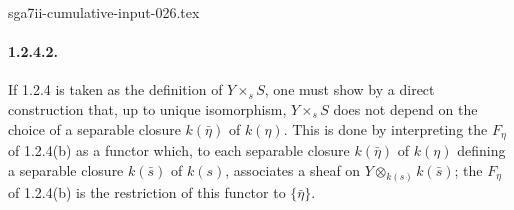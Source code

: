 \begin{filecontents*}{sga7ii-cumulative-input-026.tex}
\paragraph{1.2.4.2.}
If 1.2.4 is taken as the definition of $Y\times_sS$, one must show by
a direct construction that, up to unique isomorphism, $Y\times_sS$
does not depend on the choice of a separable closure $k(\bar\eta)$ of
$k(\eta)$.  This is done by interpreting the $F_\eta$ of 1.2.4(b) as
a functor which, to each separable closure $k(\bar\eta)$ of $k(\eta)$
defining a separable closure $k(\bar s)$ of $k(s)$, associates a sheaf
on $Y\otimes_{k(s)}k(\bar s)$; the $F_\eta$ of 1.2.4(b) is the
restriction of this functor to $\{\bar\eta\}$.

\end{filecontents*}
